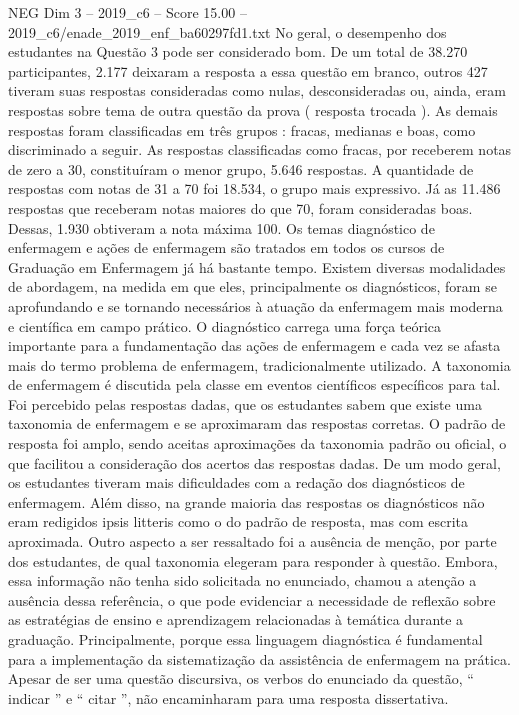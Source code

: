 \begin{textsample}{NEG Dim 3 – 2019\_c6 – Score 15.00 – 2019\_c6/enade\_2019\_enf\_ba60297fd1.txt}
No geral, o desempenho dos estudantes na Questão 3 pode ser considerado bom.
De um total de 38.270 participantes, 2.177 deixaram a resposta a essa questão em branco, outros 427 tiveram suas respostas consideradas como nulas, desconsideradas ou, ainda, eram respostas sobre tema de outra questão da prova ( resposta trocada ).
As demais respostas foram classificadas em três grupos : fracas, medianas e boas, como discriminado a seguir.
As respostas classificadas como fracas, por receberem notas de zero a 30, constituíram o menor grupo, 5.646 respostas.
A quantidade de respostas com notas de 31 a 70 foi 18.534, o grupo mais expressivo.
Já as 11.486 respostas que receberam notas maiores do que 70, foram consideradas boas.
Dessas, 1.930 obtiveram a nota máxima 100.
Os temas diagnóstico de enfermagem e ações de enfermagem são tratados em todos os cursos de Graduação em Enfermagem já há bastante tempo.
Existem diversas modalidades de abordagem, na medida em que eles, principalmente os diagnósticos, foram se aprofundando e se tornando necessários à atuação da enfermagem mais moderna e científica em campo prático.
O diagnóstico carrega uma força teórica importante para a fundamentação das ações de enfermagem e cada vez se afasta mais do termo problema de enfermagem, tradicionalmente utilizado.
A taxonomia de enfermagem é discutida pela classe em eventos científicos específicos para tal.
Foi percebido pelas respostas dadas, que os estudantes sabem que existe uma taxonomia de enfermagem e se aproximaram das respostas corretas.
O padrão de resposta foi amplo, sendo aceitas aproximações da taxonomia padrão ou oficial, o que facilitou a consideração dos acertos das respostas dadas.
De um modo geral, os estudantes tiveram mais dificuldades com a redação dos diagnósticos de enfermagem.
Além disso, na grande maioria das respostas os diagnósticos não eram redigidos ipsis litteris como o do padrão de resposta, mas com escrita aproximada.
Outro aspecto a ser ressaltado foi a ausência de menção, por parte dos estudantes, de qual taxonomia elegeram para responder à questão.
Embora, essa informação não tenha sido solicitada no enunciado, chamou a atenção a ausência dessa referência, o que pode evidenciar a necessidade de reflexão sobre as estratégias de ensino e aprendizagem relacionadas à temática durante a graduação.
Principalmente, porque essa linguagem diagnóstica é fundamental para a implementação da sistematização da assistência de enfermagem na prática.
Apesar de ser uma questão discursiva, os verbos do enunciado da questão, “ indicar ” e “ citar ”, não encaminharam para uma resposta dissertativa.

\end{textsample}

